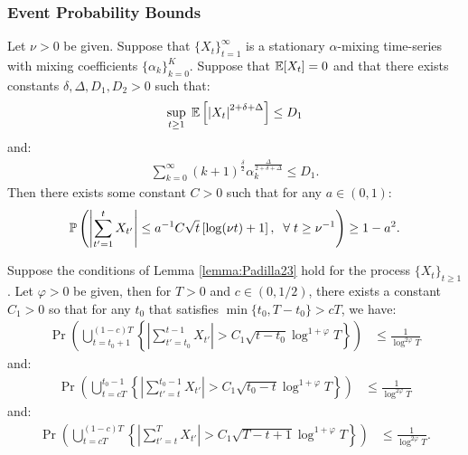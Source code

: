 \subsubsection{Event Probability Bounds}

\begin{lemma}\label{lemma:Padilla23}
Let $\nu > 0$ be given. Suppose that $\{X_t\}_{t=1}^\infty$ is a stationary $\alpha$-mixing time-series with mixing coefficients $\{\alpha_k\}_{k=0}^K$. Suppose that $\mathbb{E}[X_t] = 0$ and that there exists constants $\delta, \Delta, D_1, D_2 > 0$ such that:
\begin{align*}
    \sup_{t \geq 1}\; \mathbb{E}\left[\left|X_t\right|^{2+\delta+\Delta}\right] \leq D_1 
\end{align*}
and:
\begin{align*}
    \sum_{k=0}^\infty (k+1)^{\frac{\delta}{2}} \alpha_k^{\frac{\Delta}{2+\delta+\Delta}} \leq D_1.
\end{align*}
Then there exists some constant $C > 0$ such that for any $a \in (0,1)$:
\begin{align*}
    \mathbb{P} \left(\left|\sum_{t'=1}^t X_{t'}\right| \leq a^{-1}C\sqrt{t}\left[\log (\nu t) + 1\right], \;\;\forall\; t\geq \nu^{-1}\right) 
    \geq 1 - a^2.
\end{align*}
\end{lemma}

\begin{lemma}\label{lemma:2}
Suppose the conditions of Lemma \ref{lemma:Padilla23} hold for the process $\{X_t\}_{t \geq 1}$. Let $\varphi > 0$ be given, then for $T > 0$ and $c \in (0,1/2)$, there exists a constant $C_1 > 0$ so that for any $t_0$ that satisfies $\min\{t_0,T-t_0\} > cT$, we have:
\begin{align*}
    \Pr \left(\bigcup_{t=t_0 + 1}^{(1-c)T}\left\{ \left|\sum_{t'=t_0}^{t-1} X_{t'}\right| > C_1\sqrt{t-t_0}\log^{1+\varphi}T\right\}\right) 
    &\leq \frac{1}{\log^{2\varphi} T}
\end{align*}
and:
\begin{align*}
    \Pr \left(\bigcup_{t=cT}^{t_0-1}\left\{ \left|\sum_{t'=t}^{t_0-1} X_{t'}\right| > C_1\sqrt{t_0-t}\log^{1+\varphi}T\right\}\right) 
    &\leq \frac{1}{\log^{2\varphi} T}
\end{align*}
and:
\begin{align*}
    \Pr \left(\bigcup_{t=cT}^{(1-c)T}\left\{ \left|\sum_{t'=t}^{T} X_{t'}\right| > C_1\sqrt{T-t+1}\log^{1+\varphi}T\right\}\right) 
    &\leq \frac{1}{\log^{2\varphi} T}.
\end{align*}
\end{lemma}

